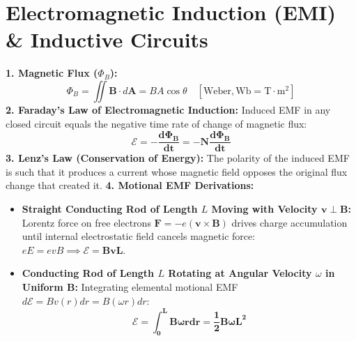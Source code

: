 \documentclass[10pt,twoside,openright]{book}
\begin{document}
\section{Electromagnetic Induction (EMI) \& Inductive Circuits}

\begin{conceptbox}
\textbf{1. Magnetic Flux ($\Phi_B$):}
\begin{equation}
  \Phi_B = \iint \mathbf{B}\cdot d\mathbf{A} = B A \cos\theta \quad [\mathrm{Weber}, \mathrm{Wb} = \mathrm{T}\cdot\mathrm{m}^2]
\end{equation}
\textbf{2. Faraday's Law of Electromagnetic Induction:}
Induced EMF in any closed circuit equals the negative time rate of change of magnetic flux:
\begin{equation}
  \mathbf{\mathcal{E} = -\frac{d\Phi_B}{dt} = -N \frac{d\Phi_B}{dt}}
\end{equation}
\textbf{3. Lenz's Law (Conservation of Energy):}
The polarity of the induced EMF is such that it produces a current whose magnetic field opposes the original flux change that created it.
\textbf{4. Motional EMF Derivations:}
\begin{itemize}
  \item \textbf{Straight Conducting Rod of Length $L$ Moving with Velocity $\mathbf{v} \perp \mathbf{B}$:}
  Lorentz force on free electrons $\mathbf{F} = -e(\mathbf{v} \times \mathbf{B})$ drives charge accumulation until internal electrostatic field cancels magnetic force: $eE = evB \implies \mathbf{\mathcal{E} = B v L}$.
  \item \textbf{Conducting Rod of Length $L$ Rotating at Angular Velocity $\omega$ in Uniform $\mathbf{B}$:}
  Integrating elemental motional EMF $d\mathcal{E} = B v(r) dr = B (\omega r) dr$:
  \begin{equation}
    \mathbf{\mathcal{E} = \int_0^L B \omega r dr = \frac{1}{2} B \omega L^2}
  \end{equation}
\end{itemize}
\end{conceptbox}
\end{document}
